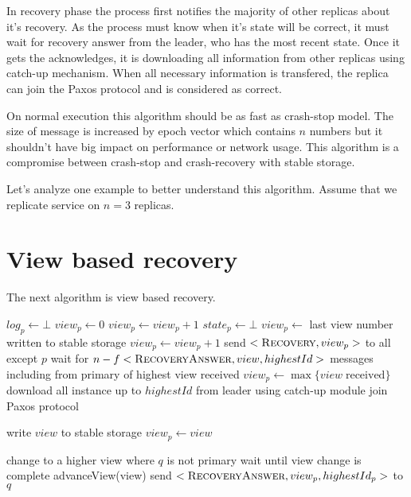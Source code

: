 In recovery phase the process first notifies the majority of other replicas about it's recovery. As the process must know when it's state will be correct, it must wait for recovery answer from the leader, who has the most recent state. Once it gets the acknowledges, it is downloading all information from other replicas using catch-up mechanism.  When all necessary information is transfered, the replica can join the Paxos protocol and is considered as correct.

On normal execution this algorithm should be as fast as crash-stop model. The size of \prepareOK message is increased by epoch vector which contains $n$ numbers but it shouldn't have big impact on performance or network usage. This algorithm is a compromise between crash-stop and crash-recovery with stable storage.  

\begin{TODO}
Let's analyze one example to better understand this algorithm. Assume that we replicate service on $n = 3$ replicas.
\end{TODO}

\section{View based recovery}
\label{sec:view_ss}

The next algorithm is view based recovery.
\begin{algorithmic}[1]
  \INIT{}
    \STATE $log_p \leftarrow \bot$ %
    \STATE $view_p \leftarrow 0$
      \STATE $view_p \leftarrow view_p + 1$
    \ENDIF
    \STATE $state_p \leftarrow \bot$ %
    \STATE
      \STATE $view_p \leftarrow$ last view number written to stable storage
        \STATE $view_p \leftarrow view_p + 1$
      \ENDIF
      \STATE send $<\textsc{Recovery}, view_p>$ to all except $p$
      \STATE wait for $n-f <\textsc{RecoveryAnswer}, view, highestId>$ messages including from primary of highest view received
      \STATE $view_p \leftarrow \max\{{ view \; \mathrm{received}}\}$
      \STATE download all instance up to $highestId$ from leader using catch-up module
    \ENDIF
    \STATE
    \STATE join Paxos protocol
  \ENDINIT

  \vspace{1em}
    \STATE write $view$ to stable storage
    \STATE $view_p \leftarrow view$
  \ENDPROC

  \vspace{1em}
      \STATE change to a higher view where $q$ is not primary
      \STATE wait until view change is complete
    \ENDIF
      \STATE advanceView(view)
    \ENDIF
    \STATE send $<\textsc{RecoveryAnswer}, view_p, highestId_p>$ to $q$
  \ENDUPON
\end{algorithmic}


